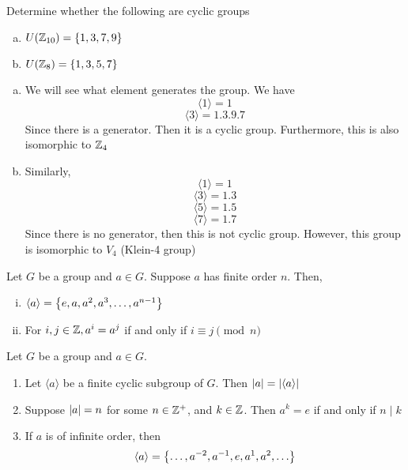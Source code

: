 \begin{exercise}
    Determine whether the following are cyclic groups
    \begin{enumerate}[(a)]
        \item $U\qty(\mathbb{Z}_{10}) = \qty{1, 3, 7, 9}$
        \item $U\qty(\mathbb{Z}_8) = \qty{1, 3, 5, 7}$
    \end{enumerate}
\end{exercise}

\begin{solution} \phantom{blank}
    \begin{enumerate}[(a)] 
        \item We will see what element generates the group. We have
        \[ \langle 1 \rangle = \qty{1} \]
        \[ \langle 3 \rangle = \qty{1, 3, 9, 7}\]
        Since there is a generator. Then it is a cyclic group. Furthermore, this is also isomorphic to $\mathbb{Z}_4$
        \item Similarly, 
                \[ \langle 1 \rangle = \qty{1} \]
        \[ \langle 3 \rangle = \qty{1, 3} \]
        \[ \langle 5 \rangle = \qty{1, 5} \]
        \[ \langle 7 \rangle = \qty{1 ,7} \]
        Since there is no generator, then this is not cyclic group. However, this group is isomorphic to $V_4$ (Klein-4 group)
    \end{enumerate}
\end{solution}

\begin{theorem}
    Let $G$ be a group and $a \in G$. Suppose $a$ has finite order $n$. Then,
    \begin{enumerate}[i.]
        \item $\langle a \rangle = \qty{e, a, a^2, a^3, \ldots, a^{n-1}}$
        \item For $i, j \in \mathbb{Z}, a^i = a^j$ if and only if $i \equiv j \pmod{n}$
    \end{enumerate}
\end{theorem}

\begin{remark}
    Let $G$ be a group and $a \in G$.
    \begin{enumerate}
        \item Let $\langle a \rangle$ be a finite cyclic subgroup of $G$. Then $\qty|a| = \qty| \langle a \rangle |$
        \item Suppose $\qty|a| = n$ for some $n \in \mathbb{Z}^+$, and $k \in \mathbb{Z}$. Then $a^k = e$ if and only if $n \mid k$
        \item If $a$ is of infinite order, then
        \[ \langle a \rangle = \qty{\ldots, a^{-2}, a^{-1}, e, a^1, a^2, \ldots} \]
    \end{enumerate} 
\end{remark}

